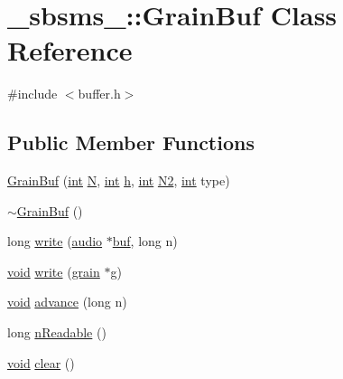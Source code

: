 \hypertarget{class__sbsms___1_1_grain_buf}{}\section{\+\_\+sbsms\+\_\+\+:\+:Grain\+Buf Class Reference}
\label{class__sbsms___1_1_grain_buf}


{\ttfamily \#include $<$buffer.\+h$>$}

\subsection*{Public Member Functions}
\begin{DoxyCompactItemize}
\item 
\hyperlink{class__sbsms___1_1_grain_buf_aaa194be729f00991a9816619a2725c1a}{Grain\+Buf} (\hyperlink{xmltok_8h_a5a0d4a5641ce434f1d23533f2b2e6653}{int} \hyperlink{rfft2d_test_m_l_8m_af6d1246b147a7c5763d9fc83082020ff}{N}, \hyperlink{xmltok_8h_a5a0d4a5641ce434f1d23533f2b2e6653}{int} \hyperlink{class__sbsms___1_1_grain_buf_ad39a40f0146c178ef21a0ce5028d0641}{h}, \hyperlink{xmltok_8h_a5a0d4a5641ce434f1d23533f2b2e6653}{int} \hyperlink{class__sbsms___1_1_grain_buf_a04a57b428df8e80f9dd2b0bf33d3843f}{N2}, \hyperlink{xmltok_8h_a5a0d4a5641ce434f1d23533f2b2e6653}{int} type)
\item 
\hyperlink{class__sbsms___1_1_grain_buf_a6adb3fc5ea4a66ba37f8dd621bddbf01}{$\sim$\+Grain\+Buf} ()
\item 
long \hyperlink{class__sbsms___1_1_grain_buf_aa8355ec3dc107ec7911ba0bb4b8c8ae7}{write} (\hyperlink{namespace__sbsms___a11786cc5bd221ff534972ae350477324}{audio} $\ast$\hyperlink{class__sbsms___1_1_grain_buf_ab40450f7519ee3e0fe4f726d51b93bc7}{buf}, long n)
\item 
\hyperlink{sound_8c_ae35f5844602719cf66324f4de2a658b3}{void} \hyperlink{class__sbsms___1_1_grain_buf_a7e7aacad66c947336d0ae44876c201b2}{write} (\hyperlink{class__sbsms___1_1grain}{grain} $\ast$g)
\item 
\hyperlink{sound_8c_ae35f5844602719cf66324f4de2a658b3}{void} \hyperlink{class__sbsms___1_1_grain_buf_a974069396b51b5bc23a332147203bd78}{advance} (long n)
\item 
long \hyperlink{class__sbsms___1_1_grain_buf_a37413680d75b40072f5ef6da13292f01}{n\+Readable} ()
\item 
\hyperlink{sound_8c_ae35f5844602719cf66324f4de2a658b3}{void} \hyperlink{class__sbsms___1_1_grain_buf_ac1e7b5aa49424d520c3fe3ca04fbc08f}{clear} ()

\end{DoxyCompactItemize}

